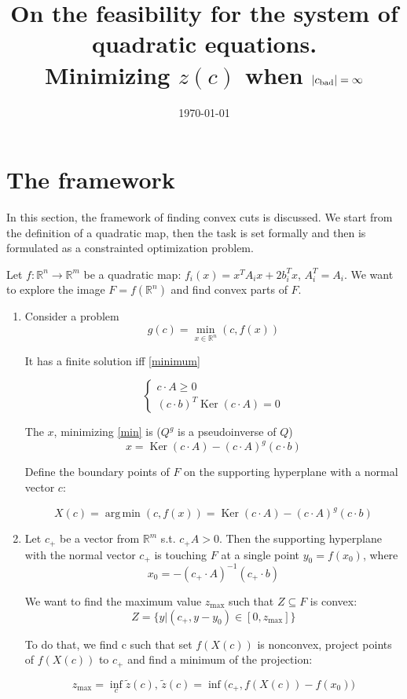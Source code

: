 \documentclass[a4paper]{article}
\date{\today}
\title{On the feasibility for the system of quadratic equations.\\Minimizing $z(c)$ when $|c_{\mathrm{bad}}|=\infty$}
\DeclareMathOperator{\Ker}{Ker}
\DeclareMathOperator*{\argmin}{arg\,min}
\begin{document}
\maketitle
\section{The framework}
In this section, the framework of finding convex cuts is discussed. We start from the definition of a quadratic map, then the task is set formally and then is formulated as a constrainted optimization problem.

Let $f\colon\mathbb{R}^n\to\mathbb{R}^m$ be a quadratic map: $f_i(x)=x^TA_ix+2b_i^Tx$, $A_i^T=A_i$. We want to explore the image $F=f(\mathbb{R}^n)$ and find convex parts of $F$.
\begin{enumerate}
\item Consider a problem
\begin{equation}
\label{min} g(c)=\min\limits_{x\in\mathbb{R}^n}(c,f(x))
\end{equation}

It has a finite solution iff \ref{minimum}

$$
\begin{cases}c\cdot A\geqslant0\\
(c\cdot b)^T\Ker (c\cdot A)=0\end{cases}
$$


The $x$, minimizing \ref{min} is ($Q^g$ is a pseudoinverse of $Q$)
$$x=\Ker(c\cdot A)-(c\cdot A)^g(c\cdot b)$$

Define the boundary points of $F$ on the supporting hyperplane with a normal vector $c$:

$$X(c)=\argmin (c, f(x))=\Ker(c\cdot A)-(c\cdot A)^g(c\cdot b)$$

\item Let $c_+$ be a vector from $\mathbb{R}^m$ s.t. $c_+A>0$. Then the supporting hyperplane with the normal vector $c_+$ is touching $F$ at a single point $y_0=f(x_0)$, where $$x_0=-(c_+\cdot A)^{-1}(c_+\cdot b)$$


We want to find the maximum value $z_{\max}$ such that $Z\subseteq F$ is convex:
$$Z=\{y\big| (c_+,y-y_0)\in[0,z_{\max}]\}$$

To do that, we find c such that set $f(X(c))$ is nonconvex, project points of $f(X(c))$ to $c_+$ and find a minimum of the projection:

\begin{equation}
\label{zc}
z_{\max}=\inf_c \tilde{z}(c),\, \tilde{z}(c)=\inf \big(c_+, f(X(c))-f(x_0)\big)
\end{equation}



\end{enumerate}
\end{document}
